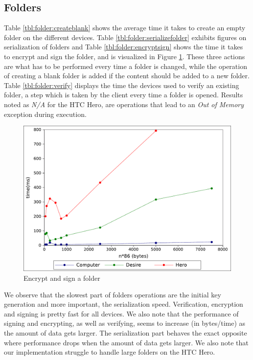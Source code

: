 \documentclass[pdftex,english,10pt,b5paper,twoside]{book}
\begin{document}
\subsection{Folders}

Table \ref{tbl:folder:createblank} shows the average time it takes to create an
empty folder on the different devices. Table \ref{tbl:folder:serializefolder}
exhibits figures on serialization of folders and Table
\ref{tbl:folder:encryptsign} shows the time it takes to encrypt and sign the
folder, and is visualized in Figure \ref{fig:results:signencrypt}. These three
actions are what has to be performed every time a folder is changed, while the
operation of creating a blank folder is added if the content should be added to
a new folder. Table \ref{tbl:folder:verify} displays the time the devices used
to verify an existing folder, a step which is taken by the client every time a
folder is opened. Results noted as \emph{N/A} for the HTC Hero, are operations
that lead to an \emph{Out of Memory} exception during execution.




\begin{figure}[h!]
    \centering
    \includegraphics[scale=0.6]{graph_signandencrypt.pdf}
    \caption{Encrypt and sign a folder}
    \label{fig:results:signencrypt}
\end{figure}


We observe that the slowest part of folders operations are the initial key
generation and more important, the serialization speed. Verification,
encryption and signing is pretty fast for all devices. We also note that the
performance of signing and encrypting, as well as verifying, seems to increase
(in bytes/time) as the amount of data gets larger. The serialization part
behaves the exact opposite where performance drops when the amount of data gets
larger. We also note that our implementation struggle to handle large folders
on the HTC Hero.
\end{document}
